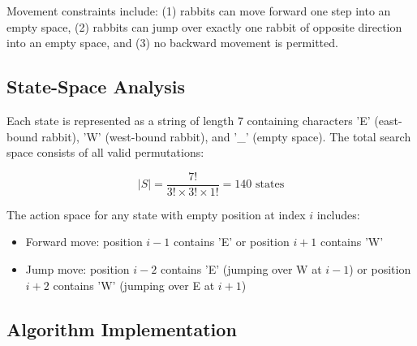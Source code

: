 \documentclass[conference]{IEEEtran}
\begin{document}
Movement constraints include: (1) rabbits can move forward one step into an empty space, (2) rabbits can jump over exactly one rabbit of opposite direction into an empty space, and (3) no backward movement is permitted.

\subsection{State-Space Analysis}
Each state is represented as a string of length 7 containing characters 'E' (east-bound rabbit), 'W' (west-bound rabbit), and '\_' (empty space). The total search space consists of all valid permutations:

\begin{equation}
|S| = \frac{7!}{3! \times 3! \times 1!} = 140 \text{ states}
\end{equation}

The action space for any state with empty position at index $i$ includes:
\begin{itemize}
\item Forward move: position $i-1$ contains 'E' or position $i+1$ contains 'W'
\item Jump move: position $i-2$ contains 'E' (jumping over W at $i-1$) or position $i+2$ contains 'W' (jumping over E at $i+1$)
\end{itemize}


\subsection{Algorithm Implementation}
\end{document}
